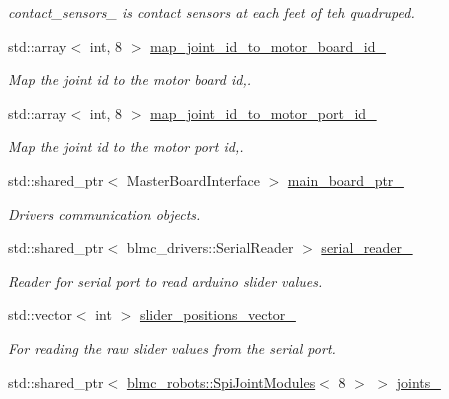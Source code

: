 \begin{DoxyCompactItemize}
\begin{DoxyCompactList}\small\item\em contact\+\_\+sensors\+\_\+ is contact sensors at each feet of teh quadruped. \end{DoxyCompactList}\item 
std\+::array$<$ int, 8 $>$ \hyperlink{classblmc__robots_1_1Solo8_a5d04c4cdbd954dc2a76c08989ccf0040}{map\+\_\+joint\+\_\+id\+\_\+to\+\_\+motor\+\_\+board\+\_\+id\+\_\+}
\begin{DoxyCompactList}\small\item\em Map the joint id to the motor board id,. \end{DoxyCompactList}\item 
std\+::array$<$ int, 8 $>$ \hyperlink{classblmc__robots_1_1Solo8_a6c1a5948cf6d2ec18d619753d51b8546}{map\+\_\+joint\+\_\+id\+\_\+to\+\_\+motor\+\_\+port\+\_\+id\+\_\+}
\begin{DoxyCompactList}\small\item\em Map the joint id to the motor port id,. \end{DoxyCompactList}\item 
std\+::shared\+\_\+ptr$<$ Master\+Board\+Interface $>$ \hyperlink{classblmc__robots_1_1Solo8_a7beb3d9ca8cc39e832fb5515bd2e71c5}{main\+\_\+board\+\_\+ptr\+\_\+}
\begin{DoxyCompactList}\small\item\em Drivers communication objects. \end{DoxyCompactList}\item 
std\+::shared\+\_\+ptr$<$ blmc\+\_\+drivers\+::\+Serial\+Reader $>$ \hyperlink{classblmc__robots_1_1Solo8_ac01d9597b2e0446e29c249f74c6ffc8f}{serial\+\_\+reader\+\_\+}\hypertarget{classblmc__robots_1_1Solo8_ac01d9597b2e0446e29c249f74c6ffc8f}{}\label{classblmc__robots_1_1Solo8_ac01d9597b2e0446e29c249f74c6ffc8f}

\begin{DoxyCompactList}\small\item\em Reader for serial port to read arduino slider values. \end{DoxyCompactList}\item 
std\+::vector$<$ int $>$ \hyperlink{classblmc__robots_1_1Solo8_ae8717ecb7e21391ef5f54d67e0e46b5d}{slider\+\_\+positions\+\_\+vector\+\_\+}\hypertarget{classblmc__robots_1_1Solo8_ae8717ecb7e21391ef5f54d67e0e46b5d}{}\label{classblmc__robots_1_1Solo8_ae8717ecb7e21391ef5f54d67e0e46b5d}

\begin{DoxyCompactList}\small\item\em For reading the raw slider values from the serial port. \end{DoxyCompactList}\item 
std\+::shared\+\_\+ptr$<$ \hyperlink{classblmc__robots_1_1SpiJointModules}{blmc\+\_\+robots\+::\+Spi\+Joint\+Modules}$<$ 8 $>$ $>$ \hyperlink{classblmc__robots_1_1Solo8_aaca553f0634f406d2e41a0499dedd73a}{joints\+\_\+}\hypertarget{classblmc__robots_1_1Solo8_aaca553f0634f406d2e41a0499dedd73a}{}\label{classblmc__robots_1_1Solo8_aaca553f0634f406d2e41a0499dedd73a}


\end{DoxyCompactItemize}
